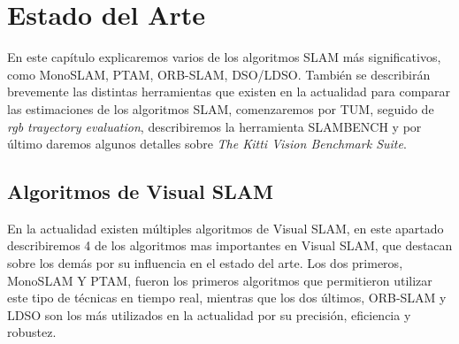 \chapter{Estado del Arte} \label{cap:Estado del Arte} %

En este capítulo explicaremos varios de los algoritmos SLAM más significativos, como MonoSLAM, PTAM, ORB-SLAM, DSO/LDSO.
También se describirán brevemente las distintas herramientas que existen en la actualidad para comparar las estimaciones de los algoritmos SLAM, comenzaremos por TUM, seguido de \textit{rgb trayectory evaluation}, describiremos la herramienta SLAMBENCH y por último daremos algunos detalles sobre \textit{The Kitti Vision Benchmark Suite}.

\section{Algoritmos de Visual SLAM}
En la actualidad existen múltiples algoritmos de Visual SLAM, en este apartado describiremos 4 de los algoritmos mas importantes en Visual SLAM, que destacan sobre los demás por su influencia en el estado del arte. Los dos primeros, MonoSLAM Y PTAM, fueron los primeros algoritmos que permitieron utilizar este tipo de técnicas en tiempo real, mientras que los dos últimos, ORB-SLAM y LDSO son los más utilizados en la actualidad por su precisión, eficiencia y robustez.



